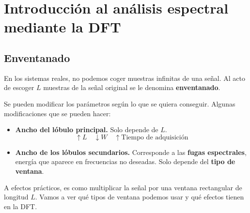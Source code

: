 \documentclass[a4paper,oneside]{book}
\begin{document}
\section{Introducción al análisis espectral mediante la DFT}

\subsection{Enventanado}

En los sistemas reales, no podemos coger muestras infinitas de una señal. Al acto de escoger $L$ muestras de la señal original se le denomina \textbf{enventanado}. 

Se pueden modificar los parámetros según lo que se quiera conseguir. Algunas modificaciones que se pueden hacer:
\begin{itemize}
	\item \textbf{Ancho del lóbulo principal.} Solo depende de $L$. \[ \uparrow L \quad \downarrow W \quad \uparrow \textrm{Tiempo de adquisición} \]
	\item \textbf{Ancho de los lóbulos secundarios.} Corresponde a las \textbf{fugas espectrales}, energía que aparece en frecuencias no deseadas. Solo depende del \textbf{tipo de ventana}.
\end{itemize}

A efectos prácticos, es como multiplicar la señal por una ventana rectangular de longitud $L$. Vamos a ver qué tipos de ventana podemos usar y qué efectos tienen en la DFT.

\newpage
\end{document}
